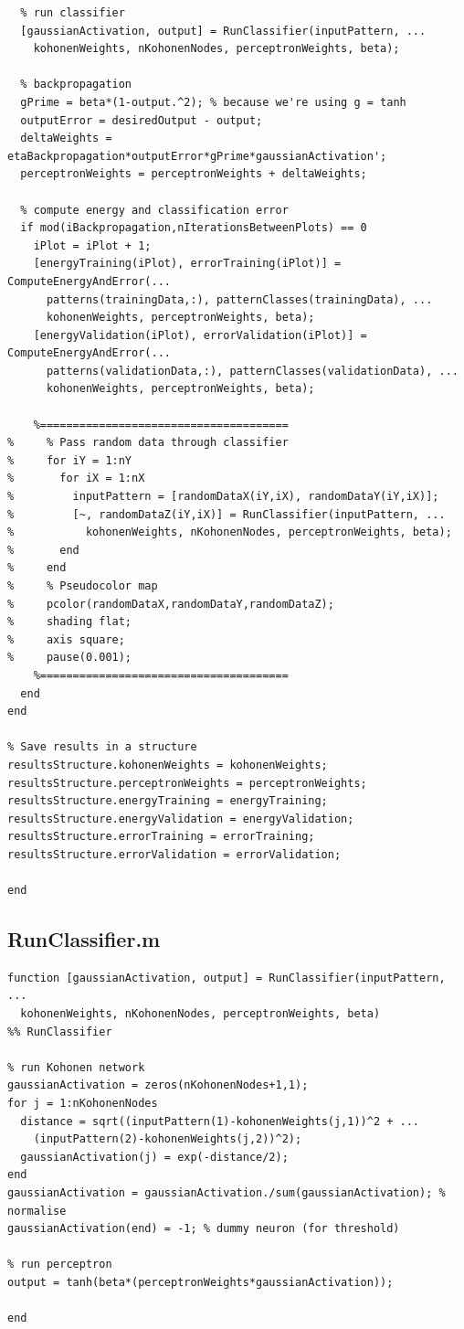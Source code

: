 \documentclass[12pt,titlepage]{article}
\begin{document}
\begin{lstlisting}
  % run classifier
  [gaussianActivation, output] = RunClassifier(inputPattern, ...
    kohonenWeights, nKohonenNodes, perceptronWeights, beta);

  % backpropagation
  gPrime = beta*(1-output.^2); % because we're using g = tanh
  outputError = desiredOutput - output;
  deltaWeights = etaBackpropagation*outputError*gPrime*gaussianActivation';
  perceptronWeights = perceptronWeights + deltaWeights;
  
  % compute energy and classification error
  if mod(iBackpropagation,nIterationsBetweenPlots) == 0
    iPlot = iPlot + 1;
    [energyTraining(iPlot), errorTraining(iPlot)] = ComputeEnergyAndError(...
      patterns(trainingData,:), patternClasses(trainingData), ...
      kohonenWeights, perceptronWeights, beta);
    [energyValidation(iPlot), errorValidation(iPlot)] = ComputeEnergyAndError(...
      patterns(validationData,:), patternClasses(validationData), ...
      kohonenWeights, perceptronWeights, beta);
    
    %======================================
%     % Pass random data through classifier
%     for iY = 1:nY
%       for iX = 1:nX
%         inputPattern = [randomDataX(iY,iX), randomDataY(iY,iX)];
%         [~, randomDataZ(iY,iX)] = RunClassifier(inputPattern, ...
%           kohonenWeights, nKohonenNodes, perceptronWeights, beta);
%       end
%     end
%     % Pseudocolor map
%     pcolor(randomDataX,randomDataY,randomDataZ);
%     shading flat;
%     axis square;
%     pause(0.001);
    %======================================
  end
end

% Save results in a structure
resultsStructure.kohonenWeights = kohonenWeights;
resultsStructure.perceptronWeights = perceptronWeights;
resultsStructure.energyTraining = energyTraining;
resultsStructure.energyValidation = energyValidation;
resultsStructure.errorTraining = errorTraining;
resultsStructure.errorValidation = errorValidation;

end
\end{lstlisting}



\subsection*{RunClassifier.m}
\begin{lstlisting}
function [gaussianActivation, output] = RunClassifier(inputPattern, ...
  kohonenWeights, nKohonenNodes, perceptronWeights, beta)
%% RunClassifier

% run Kohonen network
gaussianActivation = zeros(nKohonenNodes+1,1);
for j = 1:nKohonenNodes
  distance = sqrt((inputPattern(1)-kohonenWeights(j,1))^2 + ...
    (inputPattern(2)-kohonenWeights(j,2))^2);
  gaussianActivation(j) = exp(-distance/2);
end
gaussianActivation = gaussianActivation./sum(gaussianActivation); % normalise
gaussianActivation(end) = -1; % dummy neuron (for threshold)

% run perceptron
output = tanh(beta*(perceptronWeights*gaussianActivation));
  
end
\end{lstlisting}
\end{document}
